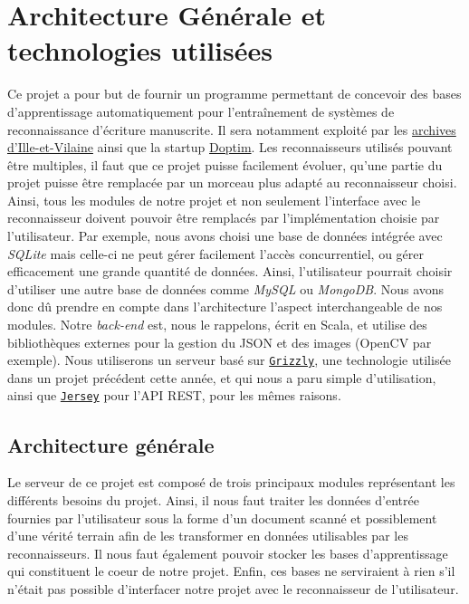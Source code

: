 

\chapter{Architecture Générale et technologies utilisées}

Ce projet a pour but de fournir un programme permettant de concevoir des bases d'apprentissage automatiquement pour l'entraînement de systèmes de reconnaissance d'écriture manuscrite. Il sera notamment exploité par les \href{http://archives.ille-et-vilaine.fr/fr}{archives d'Ille-et-Vilaine} ainsi que la startup \href{http://www.doptim.eu}{Doptim}. Les reconnaisseurs utilisés pouvant être multiples, il faut que ce projet puisse facilement évoluer, qu'une partie du projet puisse être remplacée par un morceau plus adapté au reconnaisseur choisi. Ainsi, tous les modules de notre projet et non seulement l'interface avec le reconnaisseur doivent pouvoir être remplacés par l'implémentation choisie par l'utilisateur. Par exemple, nous avons choisi une base de données intégrée avec \textit{SQLite} mais celle-ci ne peut gérer facilement l'accès concurrentiel, ou gérer efficacement une grande quantité de données. Ainsi, l'utilisateur pourrait choisir d'utiliser une autre base de données comme \textit{MySQL} ou \textit{MongoDB}. Nous avons donc dû prendre en compte dans l'architecture l'aspect interchangeable de nos modules. Notre \textit{back-end} est, nous le rappelons, écrit en Scala, et utilise des bibliothèques externes pour la gestion du JSON et des images (OpenCV par exemple). Nous utiliserons un serveur basé sur \href{https://javaee.github.io/grizzly}{\texttt{Grizzly}}, une technologie utilisée dans un projet précédent cette année, et qui nous a paru simple d'utilisation, ainsi que \href{https://jersey.github.io}{\texttt{Jersey}} pour l'API REST, pour les mêmes raisons.

\section{Architecture générale}

Le serveur de ce projet est composé de trois principaux modules représentant les différents besoins du projet. Ainsi, il nous faut traiter les données d'entrée fournies par l'utilisateur sous la forme d'un document scanné et possiblement d'une vérité terrain afin de les transformer en données utilisables par les reconnaisseurs. Il nous faut également pouvoir stocker les bases d'apprentissage qui constituent le coeur de notre projet. Enfin, ces bases ne serviraient à rien s'il n'était pas possible d'interfacer notre projet avec le reconnaisseur de l'utilisateur.

